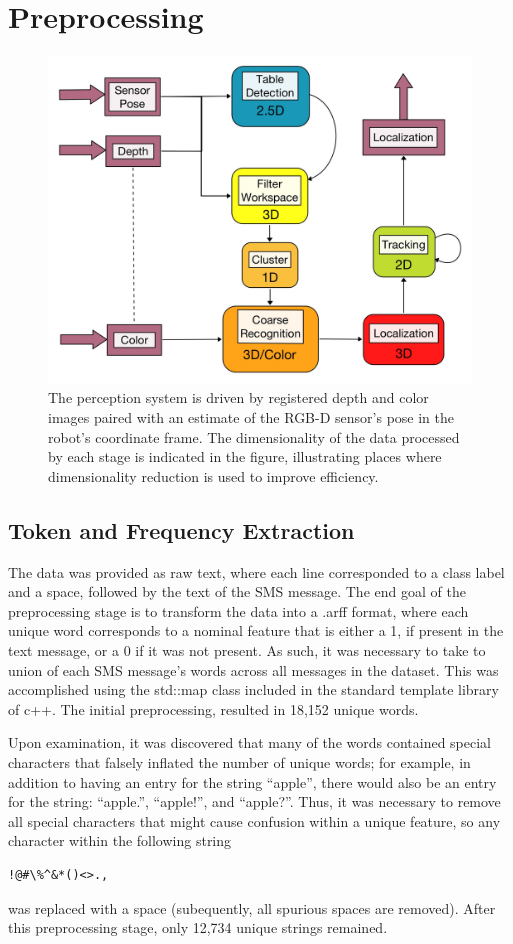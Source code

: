 \documentclass[letterpaper, 10 pt, conference]{ieeeconf}  %
\begin{document}
\section{Preprocessing}
\begin{figure}[t]
\centering
\includegraphics[width=0.9\columnwidth]{figures/perception-pipeline.jpg}
\caption{ The perception system is driven by registered depth and
  color images paired with an estimate of the RGB-D sensor's pose in
  the robot's coordinate frame. The dimensionality of the data
  processed by each stage is indicated in the figure, illustrating
  places where dimensionality reduction is used to improve efficiency.
}
\label{fig:perception-pipeline}
\end{figure}

\subsection{Token and Frequency Extraction}

The data was provided as raw text, where each line corresponded to a
class label and a space, followed by the text of the SMS message. The
end goal of the preprocessing stage is to transform the data into a
.arff format, where each unique word corresponds to a nominal feature
that is either a 1, if present in the text message, or a 0 if it was
not present. As such, it was necessary to take to union of each SMS
message's words across all messages in the dataset. This was
accomplished using the std::map class included in the standard
template library of c++.  The initial preprocessing, resulted in
18,152 unique words.  

Upon examination, it was discovered that many of the words contained
special characters that falsely inflated the number of unique words;
for example, in addition to having an entry for the string ``apple'',
there would also be an entry for the string: ``apple.'', ``apple!'',
and ``apple?''. Thus, it was necessary to remove all special
characters that might cause confusion within a unique feature, so any
character within the following
string \begin{verbatim}!@#\%^&*()<>.,\end{verbatim} was replaced with
a space (subequently, all spurious spaces are removed). After this
preprocessing stage, only 12,734 unique strings remained.
\end{document}
